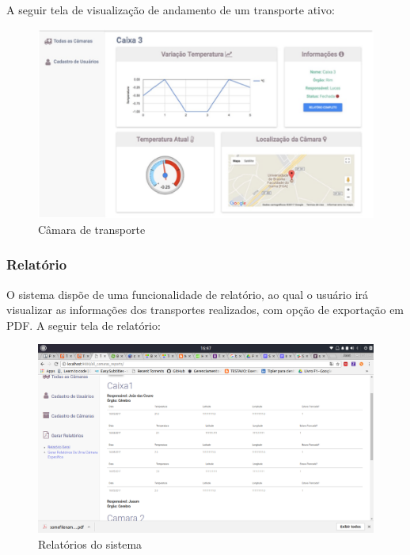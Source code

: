 	A seguir tela de visualização de andamento de um transporte ativo:

\begin{figure}[H]
\centering
\includegraphics[width=16cm]{figuras/camara_software.jpg}
\caption{Câmara de transporte}
\end{figure}

\subsubsection{Relatório}
	O sistema dispõe de uma funcionalidade de relatório, ao qual o usuário irá visualizar as informações dos transportes realizados, com opção de exportação em PDF.
	A seguir tela de relatório:
\begin{figure}[H]
\centering
\includegraphics[width=16cm]{figuras/relatorio_software.png}
\caption{Relatórios do sistema}
\end{figure}
